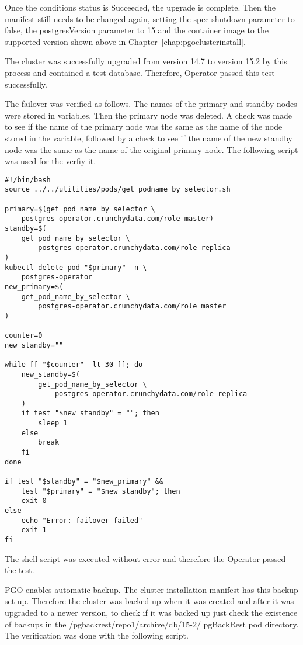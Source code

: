 Once the conditions status is Succeeded, the upgrade is complete. Then the manifest still needs to be changed again, setting the spec shutdown parameter to false, the postgresVersion parameter to 15 and the container image to the supported version shown above in Chapter~\ref{chap:pgoclusterinstall}.

The cluster was successfully upgraded from version 14.7 to version 15.2 by this process and contained a test database. Therefore, Operator passed this test successfully.

The failover was verified as follows. The names of the primary and standby nodes were stored in variables. Then the primary node was deleted. A check was made to see if the name of the primary node was the same as the name of the node stored in the variable, followed by a check to see if the name of the new standby node was the same as the name of the original primary node. The following script was used for the verfiy it.

\begin{verbatim}
#!/bin/bash
source ../../utilities/pods/get_podname_by_selector.sh

primary=$(get_pod_name_by_selector \
    postgres-operator.crunchydata.com/role master)
standby=$(
    get_pod_name_by_selector \
        postgres-operator.crunchydata.com/role replica
)
kubectl delete pod "$primary" -n \
    postgres-operator
new_primary=$(
    get_pod_name_by_selector \
        postgres-operator.crunchydata.com/role master
)

counter=0
new_standby=""

while [[ "$counter" -lt 30 ]]; do
    new_standby=$(
        get_pod_name_by_selector \
            postgres-operator.crunchydata.com/role replica
    )
    if test "$new_standby" = ""; then
        sleep 1
    else
        break
    fi
done

if test "$standby" = "$new_primary" &&
    test "$primary" = "$new_standby"; then
    exit 0
else
    echo "Error: failover failed"
    exit 1
fi
\end{verbatim}

The shell script was executed without error and therefore the Operator passed the test.


PGO enables automatic backup. The cluster installation manifest has this backup set up. Therefore the cluster was backed up when it was created and after it was upgraded to a newer version, to check if it was backed up just check the existence of backups in the /pgbackrest/repo1/archive/db/15-2/ pgBackRest pod directory. The verification was done with the following script.


